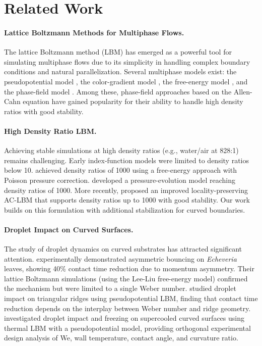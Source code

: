 \section{Related Work}\label{sec:related}

\paragraph{Lattice Boltzmann Methods for Multiphase Flows.}
The lattice Boltzmann method (LBM) has emerged as a powerful tool for simulating multiphase flows due to its simplicity in handling complex boundary conditions and natural parallelization. Several multiphase models exist: the pseudopotential model \citep{shan1993lattice}, the color-gradient model \citep{gunstensen1991lattice}, the free-energy model \citep{swift1995lattice}, and the phase-field model \citep{lee2005lattice}. Among these, phase-field approaches based on the Allen-Cahn equation \citep{fakhari2017improved} have gained popularity for their ability to handle high density ratios with good stability.

\paragraph{High Density Ratio LBM.}
Achieving stable simulations at high density ratios (e.g., water/air at 828:1) remains challenging. Early index-function models were limited to density ratios below 10. \citet{inamuro2004lattice} achieved density ratios of 1000 using a free-energy approach with Poisson pressure correction. \citet{lee2003pressure} developed a pressure-evolution model reaching density ratios of 1000. More recently, \citet{fakhari2017improved} proposed an improved locality-preserving AC-LBM that supports density ratios up to 1000 with good stability. Our work builds on this formulation with additional stabilization for curved boundaries.

\paragraph{Droplet Impact on Curved Surfaces.}
The study of droplet dynamics on curved substrates has attracted significant attention. \citet{liu2015symmetry} experimentally demonstrated asymmetric bouncing on \emph{Echeveria} leaves, showing 40\% contact time reduction due to momentum asymmetry. Their lattice Boltzmann simulations (using the Lee-Liu free-energy model) confirmed the mechanism but were limited to a single Weber number. \citet{xu2022droplet} studied droplet impact on triangular ridges using pseudopotential LBM, finding that contact time reduction depends on the interplay between Weber number and ridge geometry. \citet{xiao2025numerical} investigated droplet impact and freezing on supercooled curved surfaces using thermal LBM with a pseudopotential model, providing orthogonal experimental design analysis of We, wall temperature, contact angle, and curvature ratio.

